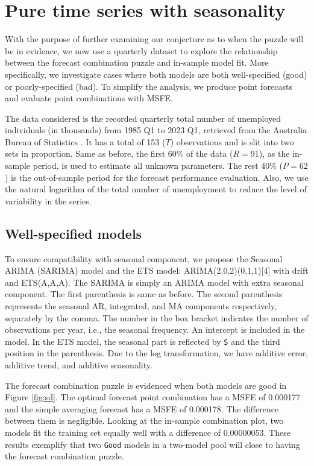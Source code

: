 \documentclass{monashthesis}
\begin{document}
\hypertarget{pure-time-series-with-seasonality}{%
\section{Pure time series with seasonality}\label{pure-time-series-with-seasonality}}

With the purpose of further examining our conjecture as to when the puzzle will be in evidence, we now use a quarterly dataset to explore the relationship between the forecast combination puzzle and in-sample model fit. More specifically, we investigate cases where both models are both well-specified (good) or poorly-specified (bad). To simplify the analysis, we produce point forecasts and evaluate point combinations with MSFE.

The data considered is the recorded quarterly total number of unemployed individuals (in thousands) from 1985 Q1 to 2023 Q1, retrieved from the Australia Bureau of Statistics \autocite{ABS}. It has a total of 153 (\(T\)) observations and is slit into two sets in proportion. Same as before, the first 60\% of the data (\(R = 91\)), as the in-sample period, is used to estimate all unknown parameters. The rest 40\% (\(P = 62\)) is the out-of-sample period for the forecast performance evaluation. Also, we use the natural logarithm of the total number of unemployment to reduce the level of variability in the series.

\hypertarget{well-specified-models}{%
\subsection{Well-specified models}\label{well-specified-models}}

To ensure compatibility with seasonal component, we propose the Seasonal ARIMA (SARIMA) model and the ETS model: ARIMA(2,0,2)(0,1,1){[}4{]} with drift and ETS(A,A,A). The SARIMA is simply an ARIMA model with extra seasonal component. The first parenthesis is same as before. The second parenthesis represents the seasonal AR, integrated, and MA components respectively, separately by the comma. The number in the box bracket indicates the number of observations per year, i.e., the seasonal frequency. An intercept is included in the model. In the ETS model, the seasonal part is reflected by \texttt{S} and the third position in the parenthesis. Due to the log transformation, we have additive error, additive trend, and additive seasonality.

The forecast combination puzzle is evidenced when both models are good in Figure \ref{fig:sd}. The optimal forecast point combination has a MSFE of 0.000177 and the simple averaging forecast has a MSFE of 0.000178. The difference between them is negligible. Looking at the in-sample combination plot, two models fit the training set equally well with a difference of 0.00000053. These results exemplify that two \texttt{Good} models in a two-model pool will close to having the forecast combination puzzle.
\end{document}
